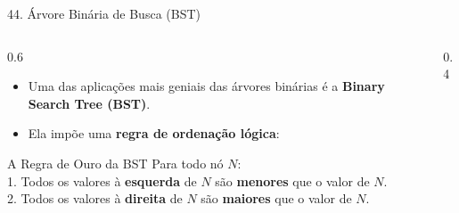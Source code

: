 \documentclass[9pt]{beamer}
\begin{document}
    \begin{frame}{44. Árvore Binária de Busca (BST)}
        \begin{columns}
            \begin{column}{0.6\textwidth}
                \begin{itemize}
                    \item Uma das aplicações mais geniais das árvores binárias é a \textbf{Binary Search Tree (BST)}.
                    \item Ela impõe uma \textbf{regra de ordenação lógica}:
                \end{itemize}
                \begin{block}{A Regra de Ouro da BST}
                    Para todo nó $N$: \\
                    1. Todos os valores à \textbf{esquerda} de $N$ são \textbf{menores} que o valor de $N$. \\
                    2. Todos os valores à \textbf{direita} de $N$ são \textbf{maiores} que o valor de $N$.
                \end{block}
            \end{column}
            \begin{column}{0.4\textwidth}
                \centering
            \end{column}
        \end{columns}
    \end{frame}
\end{document}

